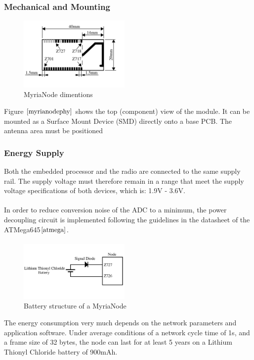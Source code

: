 \documentclass[a4paper,10pt]{report}
\begin{document}
\subsubsection{Mechanical and Mounting}
\begin{figure}
  \begin{center}
    \includegraphics[width=0.48\textwidth]{myrianodephy}
  \end{center}
  \caption{MyriaNode dimentions}
  \label{myrianodephy}
\end{figure}
Figure $\ref{myrianodephy}$ shows the top (component) view of the module. It can be mounted as a Surface Mount Device (SMD) directly onto a base PCB. The antenna area must be positioned%
\subsubsection{Energy Supply}
Both the embedded processor and the radio are connected to the same supply rail. The supply voltage must therefore remain in a range that meet the supply voltage specifications of both devices, which is: 1.9V - 3.6V. \paragraph*{}
In order to reduce conversion noise of the ADC to a minimum, the power decoupling circuit is implemented following the guidelines in the datasheet of the ATMega645$\cite{atmega}$. \paragraph*{}
\begin{figure}
  \begin{center}
    \includegraphics[width=0.48\textwidth]{battery}
  \end{center}
  \caption{Battery structure of  a MyriaNode}
  \label{battery}
\end{figure}
The energy consumption very much depends on the network parameters and application software. Under average conditions of a network cycle time of 1s, and a frame size of 32 bytes, the node can last for at least 5 years on a Lithium Thionyl Chloride battery of 900mAh.
\end{document}
